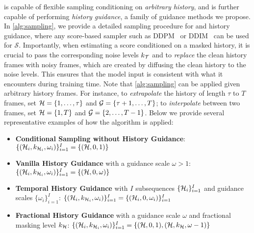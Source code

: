 \mtd is capable of flexible sampling conditioning on \emph{arbitrary history}, and is further capable of performing \emph{history guidance}, a family of guidance methods we propose. In \cref{alg:sampling}, we provide a detailed sampling procedure for \mtd and history guidance, where any score-based sampler such as DDPM~\cite{ho2020denoising} or DDIM~\cite{ddim} can be used for $\mathcal{S}$. Importantly, when estimating a score conditioned on a masked history, it is crucial to pass the corresponding noise levels $k_{\mathcal{T}}$ and to \emph{replace} the clean history frames with noisy frames, which are created by diffusing the clean history to the noise levels. This ensures that the model input is consistent with what it encounters during training time. Note that \cref{alg:sampling} can be applied given arbitrary history frames. For instance, to \emph{extrapolate} the history of length $\tau$ to $T$ frames, set ${\mathcal{H}} = \{1, \ldots, \tau\}$ and ${\mathcal{G}} = \{\tau+1, \ldots, T\}$; to \emph{interpolate} between two frames, set ${\mathcal{H}} = \{1, T\}$ and ${\mathcal{G}} = \{2, \ldots, T-1\}$. Below we provide several representative examples of how the algorithm is applied:
\begin{itemize}[topsep=0pt, itemsep=0pt]
    \item \textbf{Conditional Sampling without History Guidance}: $\{({\mathcal{H}}_i, k_{{\mathcal{H}}_i}, \omega_i)\}_{i=1}^I = \{({\mathcal{H}}, 0, 1)\}$
    \item \textbf{Vanilla History Guidance} with a guidance scale $\omega > 1$: $\{({\mathcal{H}}_i, k_{{\mathcal{H}}_i}, \omega_i)\}_{i=1}^I = \{({\mathcal{H}}, 0, \omega)\}$
    \item \textbf{Temporal History Guidance} with $I$ subsequences $\{{\mathcal{H}}_i\}_{i=1}^I$ and guidance scales $\{\omega_i\}_{i=1}^I$: $\{({\mathcal{H}}_i, k_{{\mathcal{H}}_i}, \omega_i)\}_{i=1}^I = \{({\mathcal{H}}_i, 0, \omega_i)\}_{i=1}^I$
    \item \textbf{Fractional History Guidance} with a guidance scale $\omega$ and fractional masking level $k_{\mathcal{H}}$: $\{({\mathcal{H}}_i, k_{{\mathcal{H}}_i}, \omega_i)\}_{i=1}^I = \{({\mathcal{H}}, 0, 1), ({\mathcal{H}}, k_{\mathcal{H}}, \omega - 1)\}$
\end{itemize}

